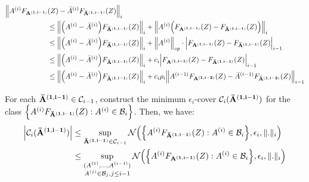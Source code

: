 \begin{proof*}
    \begin{align*}
        \Big\|
            A^{(i)}F_{\bf A^{(1, i-1)}}&(Z) - {\bar A}^{(i)}F_{\bf {\bar A}^{(1, i-1)}}(Z)
        \Big\|_i \\
            &\le \Big\|\Big( A^{(i)} - {\bar A}^{(i)} \Big)F_{\bf {\bar A}^{(1, i-1)}}(Z) \Big\|_i 
                + \Big\| A^{(i)}\Big( F_{\bf A^{(1, i-1)}}(Z) - F_{\bf {\bar A}^{(1, i-1)}}(Z) \Big)\Big\|_i \\
            &\le \Big\|\Big( A^{(i)} - {\bar A}^{(i)} \Big)F_{\bf {\bar A}^{(1, i-1)}}(Z) \Big\|_i 
                + \Big\|A^{(i)}\Big\|_{op} \cdot\Big| F_{\bf A^{(1, i-1)}}(Z) - F_{\bf {\bar A}^{(1, i-1)}}(Z) \Big|_{i-1} \\
            &\le \Big\|\Big( A^{(i)} - {\bar A}^{(i)} \Big)F_{\bf {\bar A}^{(1, i-1)}}(Z) \Big\|_i 
                + c_i\Big| F_{\bf A^{(1, i-1)}}(Z) - F_{\bf {\bar A}^{(1, i-1)}}(Z) \Big|_{i-1} \\
            &\le \Big\|\Big( A^{(i)} - {\bar A}^{(i)} \Big)F_{\bf {\bar A}^{(1, i-1)}}(Z) \Big\|_i 
                + c_i\rho_i\Big\| A^{(i-1)}F_{\bf A^{(1, i-2)}}(Z) - {\bar A}^{(i-1)}F_{\bf {\bar A}^{(1, i-2)}}(Z) \Big\|_{i-1} 
    \end{align*}

    \noindent\newline For each ${\bf {\bar A}^{(1, i-1)}}\in \mathcal{C}_{i-1}$, construct the minimum $\epsilon_i$-cover $\mathcal{C}_i({\bf {\bar A}^{(1, i-1)}})$ for the class \newline$\Big\{ A^{(i)}F_{\bf {\bar A}^{(1, i-1)}}(Z) : A^{(i)} \in \mathcal{B}_i \Big\}$. Then, we have:
    \begin{align*}
        \Big| 
            \mathcal{C}_i({\bf {\bar A}^{(1, i-1)}})
         \Big| &\le \sup_{{\bf {\bar A}^{(1, i-1)}}\in\mathcal{C}_{i-1}} \mathcal{N}\Big( 
            \Big\{ 
                A^{(i)}F_{\bf {\bar A}^{(1, i-1)}}(Z) : A^{(i)}\in\mathcal{B}_i 
             \Big\}, \epsilon_i, \|.\|_i
         \Big) \\
        &\le \sup_{
            \substack{
                (A^{(1)}, \dots, A^{(i-1)}) \\
                A^{(j)}\in\mathcal{B}_j, j \le i-1
            }    
        } \mathcal{N}\Big( 
            \Big\{ 
                A^{(i)}F_{\bf A^{(1, i-1)}}(Z) : A^{(i)} \in \mathcal{B}_i
             \Big\}, \epsilon_i, \|.\|_i
         \Big)
    \end{align*}


\end{proof*}
